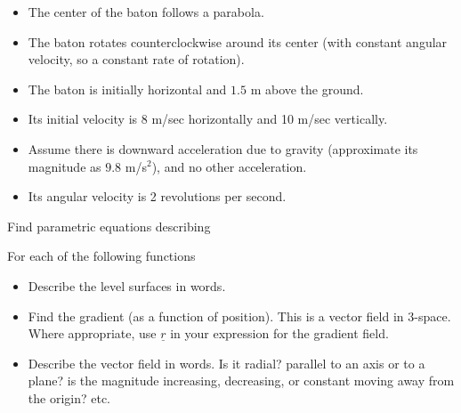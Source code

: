 \documentclass[12pt,letterpaper,noanswers]{exam}
\newcommand{\mb}[1]{\underline{#1}}
\begin{document}
\begin{questions}
\begin{itemize}
\itemsep0em
    \item The center of the baton follows a parabola.
    \item The baton rotates counterclockwise around its center (with constant angular velocity, so a constant rate of rotation).
    \item The baton is initially horizontal and $1.5$ m above the ground.
    \item Its initial velocity is 8 m/sec horizontally and 10 m/sec vertically.
    \item Assume there is downward acceleration due to gravity (approximate its magnitude as $9.8$ m/s$^2$), and no other acceleration.
    \item Its angular velocity is 2 revolutions per second.

\end{itemize}
Find parametric equations describing

\question For each of the following functions
\begin{itemize}
    \item Describe the level surfaces in words.
    \item Find the gradient (as a function of position).  This is a vector field in $3$-space.  Where appropriate, use $\mb r$ in your expression for the gradient field.
    \item Describe the vector field in words.  Is it radial?  parallel to an axis or to a plane?  is the magnitude increasing, decreasing, or constant moving away from the origin? etc.
\end{itemize} 


\end{questions}
\end{document}
